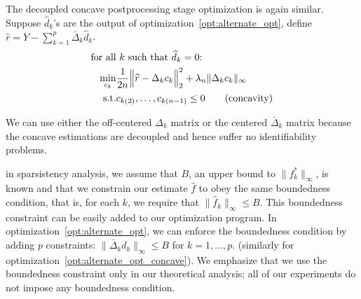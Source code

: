 The decoupled concave postprocessing stage optimization is again similar. Suppose $\hat{d}_k$'s are the output of optimization~\ref{opt:alternate_opt}, define $\hat{r} = Y - \sum_{k=1}^p \bar{\Delta}_k \hat{d}_k$. 
\begin{align}
\textrm{for all}&\textrm{ $k$ such that $\widehat{d}_k = 0$: }  \nonumber \\
  \min_{c_k} & 
      \frac{1}{2n} \Bigl \| \widehat{r} - \Delta_k c_k \Bigr \|_2^2
      + \lambda_n \| \Delta_k c_k \|_\infty 
      \label{opt:alternate_opt_concave}\\
 \textrm{s.t.} & c_{k(2)}, \ldots, c_{k(n-1)} \leq 0 \qquad \textrm{(concavity)} \nonumber
\end{align}

We can use either the off-centered $\Delta_k$ matrix or the centered $\bar{\Delta}_k$ matrix because the concave estimations are decoupled and hence suffer no identifiability problems.\\

\begin{remark}
in sparsistency analysis, we assume that $B$, an upper bound to $\| f^*_k \|_\infty$, is known and that we constrain our estimate $\hat{f}$ to obey the same boundedness condition, that is, for each $k$, we require that $\|\hat{f}_k\|_\infty \leq B$. This boundedness constraint can be easily added to our optimization program. In optimization~\ref{opt:alternate_opt}, we can enforce the boundedness condition by adding $p$ constraints: $\| \bar{\Delta}_k d_k \|_\infty \leq B$ for $k=1,...,p$. (similarly for optimization~\ref{opt:alternate_opt_concave}). We emphasize that we use the boundedness constraint only in our theoretical analysis; all of our experiments do not impose any boundedness condition.
\end{remark}



